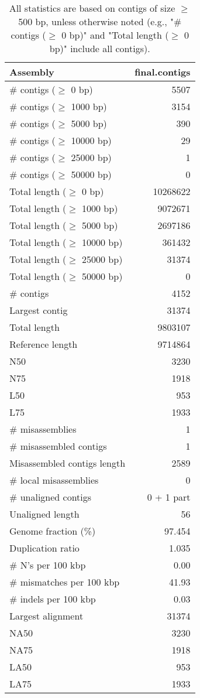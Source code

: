 \documentclass[12pt,a4paper]{article}
\begin{document}
\begin{table}[ht]
\begin{center}
\caption{All statistics are based on contigs of size $\geq$ 500 bp, unless otherwise noted (e.g., "\# contigs ($\geq$ 0 bp)" and "Total length ($\geq$ 0 bp)" include all contigs).}
\begin{tabular}{|l*{1}{|r}|}
\hline
Assembly & final.contigs \\ \hline
\# contigs ($\geq$ 0 bp) & 5507 \\ \hline
\# contigs ($\geq$ 1000 bp) & 3154 \\ \hline
\# contigs ($\geq$ 5000 bp) & 390 \\ \hline
\# contigs ($\geq$ 10000 bp) & 29 \\ \hline
\# contigs ($\geq$ 25000 bp) & 1 \\ \hline
\# contigs ($\geq$ 50000 bp) & 0 \\ \hline
Total length ($\geq$ 0 bp) & 10268622 \\ \hline
Total length ($\geq$ 1000 bp) & 9072671 \\ \hline
Total length ($\geq$ 5000 bp) & 2697186 \\ \hline
Total length ($\geq$ 10000 bp) & 361432 \\ \hline
Total length ($\geq$ 25000 bp) & 31374 \\ \hline
Total length ($\geq$ 50000 bp) & 0 \\ \hline
\# contigs & 4152 \\ \hline
Largest contig & 31374 \\ \hline
Total length & 9803107 \\ \hline
Reference length & 9714864 \\ \hline
N50 & 3230 \\ \hline
N75 & 1918 \\ \hline
L50 & 953 \\ \hline
L75 & 1933 \\ \hline
\# misassemblies & 1 \\ \hline
\# misassembled contigs & 1 \\ \hline
Misassembled contigs length & 2589 \\ \hline
\# local misassemblies & 0 \\ \hline
\# unaligned contigs & 0 + 1 part \\ \hline
Unaligned length & 56 \\ \hline
Genome fraction (\%) & 97.454 \\ \hline
Duplication ratio & 1.035 \\ \hline
\# N's per 100 kbp & 0.00 \\ \hline
\# mismatches per 100 kbp & 41.93 \\ \hline
\# indels per 100 kbp & 0.03 \\ \hline
Largest alignment & 31374 \\ \hline
NA50 & 3230 \\ \hline
NA75 & 1918 \\ \hline
LA50 & 953 \\ \hline
LA75 & 1933 \\ \hline
\end{tabular}
\end{center}
\end{table}
\end{document}
